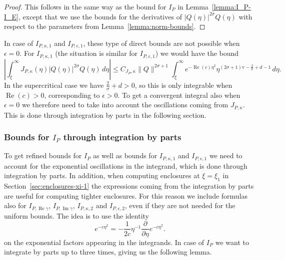 \documentclass[11pt]{article}
\DeclareMathOperator{\real}{Re}
\DeclareMathOperator{\imag}{Im}
\newcommand{\normv}{\mathrm{v}}
\begin{document}
\begin{proof}
  This follows in the same way as the bound for \(I_{P}\) in
  Lemma~\ref{lemma:I_P-I_E}, except that we use the bounds for the
  derivatives of \(|Q(\eta)|^{2\sigma}Q(\eta)\) with respect to the
  parameters from Lemma~\ref{lemma:norm-bounds}.
\end{proof}

In case of \(I_{P,\kappa,1}\) and \(I_{P,\epsilon,1}\), these type of
direct bounds are not possible when \(\epsilon = 0\). For
\(I_{P,\kappa,1}\) (the situation is similar for \(I_{P,\epsilon,1}\))
we would have the bound
\begin{equation*}
  \left|\int_{\xi}^{\infty}J_{P,\kappa}(\eta)|Q(\eta)|^{2\sigma}Q(\eta)\,d\eta\right|
  \leq C_{J_{P},\kappa}\|Q\|^{2\sigma + 1}\int_{\xi}^{\infty}e^{-\real(c)\eta^{2}}\eta^{(2\sigma + 1)\normv - \frac{2}{\sigma} + d - 1}\,d\eta.
\end{equation*}
In the supercritical case we have \(\frac{2}{\sigma} + d > 0\), so
this is only integrable when \(\real(c) > 0\), corresponding to
\(\epsilon > 0\). To get a convergent integral also when
\(\epsilon = 0\) we therefore need to take into account the
oscillations coming from \(J_{P,\kappa}\). This is done through
integration by parts in the following section.

\subsubsection{Bounds for \(I_{P}\) through integration by parts}
\label{sec:I_P-integration-by-parts-bounds}

To get refined bounds for \(I_{P}\) as well as bounds for
\(I_{P,\kappa,1}\) and \(I_{P,\epsilon,1}\) we need to account for the
exponential oscillations in the integrand, which is done through
integration by parts. In addition, when computing enclosures at
\(\xi = \xi_{1}\) in Section~\ref{sec:enclosures-xi-1} the expressions
coming from the integration by parts are useful for computing tighter
enclosures. For this reason we include formulas also for
\(I_{P,\real\gamma}\), \(I_{P,\imag\gamma}\), \(I_{P,\kappa,2}\) and
\(I_{P,\epsilon,2}\), even if they are not needed for the uniform
bounds. The idea is to use the identity
\begin{equation*}
  e^{-c\eta^{2}} = -\frac{1}{2c}\eta^{-1}\frac{\partial}{\partial \eta} e^{-c\eta^{2}}.
\end{equation*}
on the exponential factors appearing in the integrands. In case of
\(I_{P}\) we want to integrate by parts up to three times, giving us
the following lemma.
\end{document}
